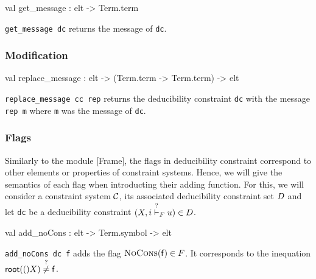 \begin{ocamldocsigend}
\begin{ocamldocdescription}
\end{ocamldocdescription}


\label{val:Constraint.Deducibility.get-underscoremessage}\begin{ocamldoccode}
val get_message : elt -> Term.term
\end{ocamldoccode}
\begin{ocamldocdescription}
{\tt{get\_message dc}} returns the message of {\tt{dc}}.


\end{ocamldocdescription}


\subsubsection{Modification}


\label{val:Constraint.Deducibility.replace-underscoremessage}\begin{ocamldoccode}
val replace_message : elt ->
  (Term.term -> Term.term) -> elt
\end{ocamldoccode}
\begin{ocamldocdescription}
{\tt{replace\_message cc rep}} returns the deducibility constraint {\tt{dc}} with the message {\tt{rep m}}
      where {\tt{m}} was the message of {\tt{dc}}.


\end{ocamldocdescription}


\subsubsection{Flags}


Similarly to the module [Frame], the flags in deducibility constraint correspond to 
      other elements or properties of constraint systems. Hence, we will give the semantics
      of each flag when introducting their adding function. For this, we will
      consider a constraint system $\mathcal{C}$, its associated deducibility constraint set $D$  and let {\tt{dc}} be 
      a deducibility constraint $(X, i \stackrel{?}{\vdash}_F u) \in D$. 

\label{val:Constraint.Deducibility.add-underscorenoCons}\begin{ocamldoccode}
val add_noCons : elt -> Term.symbol -> elt
\end{ocamldoccode}
\begin{ocamldocdescription}
{\tt{add\_noCons dc f}} adds the flag $\textsc{NoCons}(\mathsf{f}) \in F$. It corresponds to the
      inequation $\mathsf{root}(()X) \stackrel{?}{\neq} \mathsf{f}$. 


\end{ocamldocdescription}
\end{ocamldocsigend}
